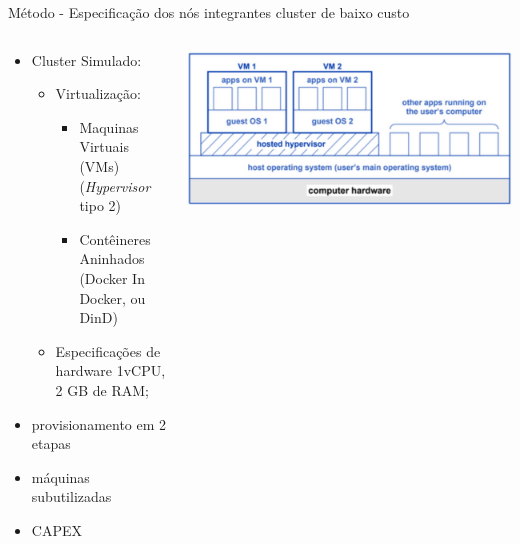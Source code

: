\documentclass[10pt,brazil]{beamer}
\theoremstyle{definition}
\begin{document}
\begin{frame}{Método - Especificação dos nós integrantes cluster de baixo custo}
  \begin{columns}
    \begin{column}{0.5\textwidth}
      \begin{itemize}
        \item Cluster Simulado:
              \begin{itemize}
                \item Virtualização:
                      \begin{itemize}
                        \item Maquinas Virtuais (VMs) (\emph{Hypervisor} tipo 2)
                        \item Contêineres Aninhados (Docker In Docker, ou DinD)
                      \end{itemize}
                \item Especificações de hardware 1vCPU, 2 GB de RAM;
              \end{itemize}
        \item provisionamento em 2 etapas
        \item máquinas subutilizadas
        \item CAPEX

      \end{itemize}
    \end{column}
    \begin{column}{0.5\textwidth}  %
      \begin{center}
        \includegraphics[width=1\textwidth]{vms.png}
      \end{center}
    \end{column}
  \end{columns}
\end{frame}


\end{document}
